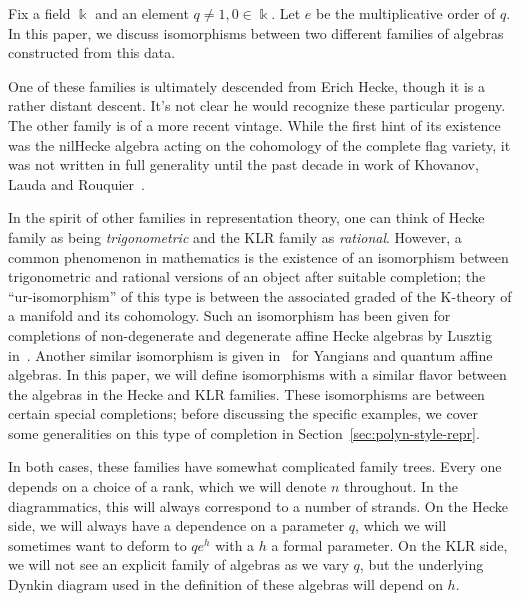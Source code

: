 \documentclass[10pt]{article}
\theoremstyle{definition}
\newcommand{\K}{\Bbbk}%
\begin{document}
Fix a field $\K$ and an element $q\neq 1,0\in \K$. Let
$e$ be the multiplicative order of $q$. In this paper, we
discuss isomorphisms between two different families of algebras
constructed from this data.

One of these families is
ultimately descended from Erich Hecke, though it is a rather distant
descent. It's not clear he would recognize these particular progeny.
The other family is of a more recent vintage. While the first hint of
its existence was the nilHecke algebra acting on the cohomology of the
complete flag variety, it was not written in full generality until the
past decade in work of Khovanov, Lauda and Rouquier~\cite{KLI,KLII,Rou2KM}. 

In the spirit of
other families in representation theory, one can think of Hecke family
as being \emph{trigonometric} and the KLR family as \emph{rational}. However, a common phenomenon
in mathematics is the existence of an isomorphism between
trigonometric and rational versions of an object after suitable completion; the
``ur-isomorphism'' of this type is between the associated graded of
the K-theory of a manifold and its cohomology. Such an isomorphism
has been given for completions of non-degenerate and degenerate affine
Hecke algebras by Lusztig in~\cite{Lusgraded}. Another similar
isomorphism is given in~\cite{GTL} for Yangians and quantum affine
algebras. In this paper, we will define isomorphisms with a similar
flavor between the algebras in the Hecke and KLR families. These
isomorphisms are between certain special completions; before
discussing the specific examples, we cover some generalities on this
type of completion in Section~\ref{sec:polyn-style-repr}.

In both cases, these families have somewhat complicated family
trees. Every one depends on a choice of a rank, which we will denote $n$
throughout. In the diagrammatics, this will always correspond to a
number of strands. On the Hecke side, we will always have a dependence
on a parameter $q$, which we will sometimes want to deform to $qe^h$
with a $h$ a formal parameter. On the KLR side, we will not see an
explicit family of algebras as we vary $q$, but the underlying
Dynkin diagram used in the definition of these algebras will depend on $h$. 
\end{document}
